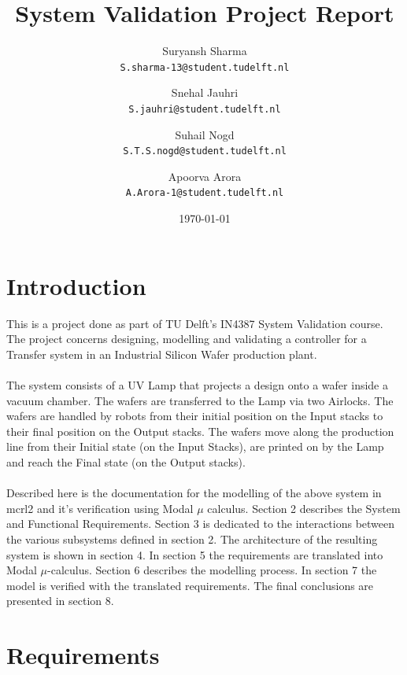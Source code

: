 \documentclass[a4paper,12pt]{article}
\begin{document}
	
	\title{System Validation Project Report}
	\author{
		Suryansh Sharma \\ 
		\texttt{S.sharma-13@student.tudelft.nl}
		\and 
		Snehal Jauhri \\
		\texttt{S.jauhri@student.tudelft.nl} 
		\and
		Suhail Nogd \\
		\texttt{S.T.S.nogd@student.tudelft.nl} 	
		\and 
		Apoorva Arora\\
		\texttt{A.Arora-1@student.tudelft.nl} 
	}
	
	\date {\today}
	\maketitle
	\newpage
	\tableofcontents
	
	\newpage
	\section{Introduction}
	This is a project done as part of TU Delft's IN4387 System Validation course. The project concerns designing, modelling and validating a controller for a Transfer system in an Industrial Silicon Wafer production plant.
	\\
	\\The system consists of a UV Lamp that projects a design onto a wafer inside a vacuum chamber. The wafers are transferred to the Lamp via two Airlocks. The wafers are handled by robots from their initial position on the Input stacks to their final position on the Output stacks. The wafers move along the production line from their Initial state (on the Input Stacks), are printed on by the Lamp and reach the Final state (on the Output stacks).
	\\
	\\Described here is the documentation for the modelling of the above system in mcrl2 and it's verification using Modal $\mu$ calculus. Section 2 describes the System and Functional Requirements. Section 3 is dedicated to the interactions between the various subsystems defined in section 2. The architecture of the resulting system is shown in section 4. In section 5 the requirements are translated into Modal $\mu$-calculus. Section 6 describes the modelling process. In section 7 the model is verified with the translated requirements. The final conclusions are presented in section 8.
	
	\section{Requirements}
	
\end{document}
